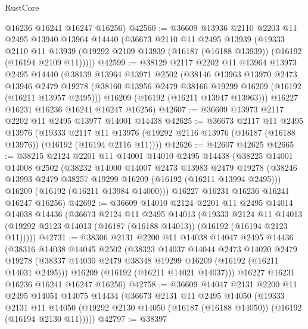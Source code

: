 \begin{lexlean}{RustCore}
\begin{coremodule}
      @16236
      @16241
      @16247
      @16256)
@42560 := @36609
    @13936
    @2110
    @2203
    @11
    @2495
    @13940
    @13964
    @14440
    (@36673
      @2110
      @11
      @2495
      @13939
      (@19333
        @2110
        @11
        @13939
        (@19292 @2109 @13939 (@16187 (@16188 @13939)) (@16192 (@16194 @2109 @11)))))
@42599 := @38129
    @2117
    @2202
    @11
    @13964
    @13973
    @2495
    @14440
    (@38139
      @13964
      @13971
      @2502
      (@38146
        @13963
        @13970
        @2473
        @13946
        @2479
        @19278
        (@38160 @13956 @2479 @38166 @19299 @16209 (@16192 (@16211 @13957 @2495)))
        @16209
        (@16192 (@16211 @13947 @13963)))
      @16227
      @16231
      @16236
      @16241
      @16247
      @16256)
@42607 := @36609 @13973 @2117 @2202 @11 @2495 @13977 @14001 @14438
@42625 := @36673
    @2117
    @11
    @2495
    @13976
    (@19333
      @2117
      @11
      @13976
      (@19292 @2116 @13976 (@16187 (@16188 @13976)) (@16192 (@16194 @2116 @11))))
@42626 := @42607 @42625
@42665 := @38215
    @2124
    @2201
    @11
    @14001
    @14010
    @2495
    @14438
    (@38225
      @14001
      @14008
      @2502
      (@38232
        @14000
        @14007
        @2473
        @13983
        @2479
        @19278
        (@38246 @13993 @2479 @38257 @19299 @16209 (@16192 (@16211 @13994 @2495)))
        @16209
        (@16192 (@16211 @13984 @14000)))
      @16227
      @16231
      @16236
      @16241
      @16247
      @16256)
@42692 := @36609
    @14010
    @2124
    @2201
    @11
    @2495
    @14014
    @14038
    @14436
    (@36673
      @2124
      @11
      @2495
      @14013
      (@19333
        @2124
        @11
        @14013
        (@19292 @2123 @14013 (@16187 (@16188 @14013)) (@16192 (@16194 @2123 @11)))))
@42731 := @38306
    @2131
    @2200
    @11
    @14038
    @14047
    @2495
    @14436
    (@38316
      @14038
      @14045
      @2502
      (@38323
        @14037
        @14044
        @2473
        @14020
        @2479
        @19278
        (@38337 @14030 @2479 @38348 @19299 @16209 (@16192 (@16211 @14031 @2495)))
        @16209
        (@16192 (@16211 @14021 @14037)))
      @16227
      @16231
      @16236
      @16241
      @16247
      @16256)
@42758 := @36609
    @14047
    @2131
    @2200
    @11
    @2495
    @14051
    @14075
    @14434
    (@36673
      @2131
      @11
      @2495
      @14050
      (@19333
        @2131
        @11
        @14050
        (@19292 @2130 @14050 (@16187 (@16188 @14050)) (@16192 (@16194 @2130 @11)))))
@42797 := @38397

\end{coremodule}
\end{lexlean}
